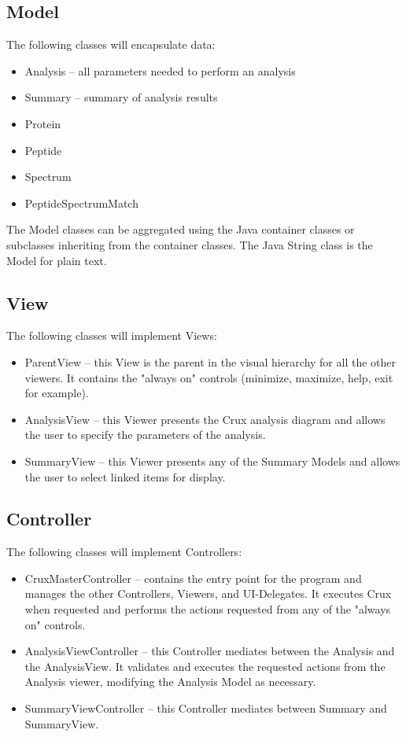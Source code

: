 \documentclass{article}
\begin{document}
\subsection{Model}

The following classes will encapsulate data:

\begin{itemize}
\item Analysis -- all parameters needed to perform an analysis
\item Summary -- summary of analysis results
\item Protein
\item Peptide
\item Spectrum
\item PeptideSpectrumMatch
\end{itemize}

The Model classes can be aggregated using the Java container classes or subclasses
inheriting from the container classes. The Java String class is the Model for
plain text.

\subsection{View}

The following classes will implement Views:

\begin{itemize}
\item ParentView -- this View is the parent in the visual hierarchy for all the other viewers. 
It contains the "always on" controls (minimize, maximize, help, exit for example).
\item AnalysisView -- this Viewer presents the Crux analysis diagram and
allows the user to specify the parameters of the analysis.
\item SummaryView -- this Viewer presents any of the Summary Models
and allows the user to select linked items for display.
\end{itemize}

\subsection{Controller}

The following classes will implement Controllers:

\begin{itemize}
\item CruxMasterController -- contains the entry
point for the program and manages the other Controllers, Viewers, and UI-Delegates.
It executes Crux when requested and performs the actions requested from any of 
the "always on" controls.
\item AnalysisViewController -- this Controller mediates between
the Analysis and the AnalysisView. It validates and executes the 
requested actions from the Analysis viewer, modifying the Analysis Model
as necessary.
\item SummaryViewController -- this Controller mediates between
Summary and SummaryView.
\end{itemize}
\end{document}
